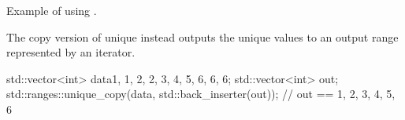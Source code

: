 \begin{box-note}
\footnotesize Example of using .
\tcblower
{}
\end{box-note}



The copy version of unique instead outputs the unique values to an output range represented by an iterator.

\begin{box-note}
\begin{cppcode}
std::vector<int> data{1, 1, 2, 2, 3, 4, 5, 6, 6, 6};
std::vector<int> out;
std::ranges::unique_copy(data, std::back_inserter(out));
// out == {1, 2, 3, 4, 5, 6}
\end{cppcode}
\end{box-note}